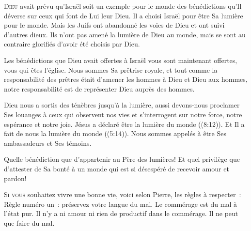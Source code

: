 
\lettrine{D}{ieu} avait prévu qu'Israël soit un exemple pour le monde
 des bénédictions qu'Il déverse sur ceux qui font de Lui leur Dieu.
 Il a choisi Israël pour être Sa lumière pour le monde.
 Mais les Juifs ont abandonné les voies de Dieu et ont suivi d'autres dieux.
 Ils n'ont pas amené la lumière de Dieu au monde, mais se sont au contraire
 glorifiés d'avoir été choisis par Dieu.

Les bénédictions que Dieu avait offertes à Israël vous sont maintenant offertes,
 vous qui êtes l'église. 
 Nous sommes Sa prêtrise royale, et tout comme la responsabilité des prêtres
 était d'amener les hommes à Dieu et Dieu aux hommes,
 notre responsabilité est de représenter Dieu auprès des hommes.


Dieu nous a sortis des ténèbres jusqu'à la lumière, aussi devons-nous proclamer
 Ses louanges à ceux qui observent nos vies et s'interrogent sur notre force,
 notre espérance et notre joie. Jésus a déclaré être
 \og la lumière du monde \fg{} ((8:12)).
 Et Il a fait de nous \og la lumière du monde \fg{} ((5:14)).
 Nous sommes appelés à être Ses ambassadeurs et Ses témoins.

Quelle bénédiction que d'appartenir au Père des lumières!
 Et quel privilège que d'attester de Sa bonté à un monde qui est si désespéré
 de recevoir amour et pardon! 

\dvrule






\lettrine{S}{i vous} souhaitez vivre une bonne vie,
 voici selon Pierre, les règles à respecter~: \\[1ex]
Règle numéro un~: préservez votre langue du mal.
 Le commérage est du mal à l'état pur. Il n'y a ni amour ni rien de productif
 dans le commérage. Il ne peut que faire du mal.

